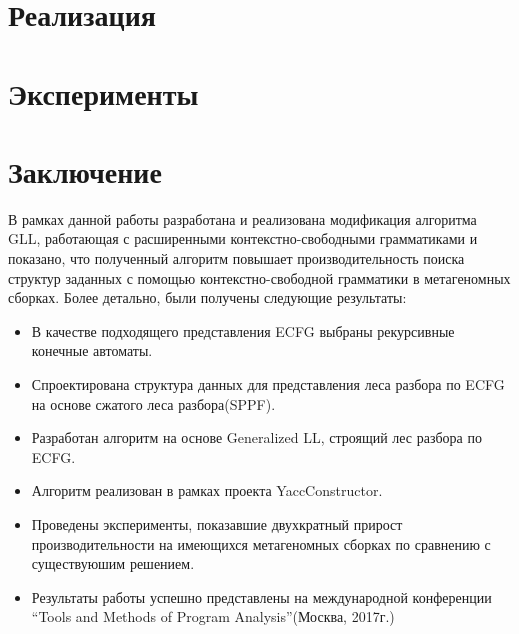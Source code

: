 \documentclass[14pt]{matmex-diploma-custom}
\begin{document}
	
	
	
	
	
	\section{Реализация}
	\section{Эксперименты}
	
	\section*{Заключение}
	В рамках данной работы разработана и реализована модификация алгоритма GLL,
	работающая с расширенными контекстно-свободными грамматиками и показано, что полученный
	алгоритм повышает производительность поиска структур заданных с помощью контекстно-свободной
	грамматики в метагеномных сборках. Более детально, были получены следующие результаты:
	\begin{itemize}
		\item В качестве подходящего представления ECFG выбраны рекурсивные конечные автоматы.
		\item Спроектирована структура данных для представления леса разбора по ECFG 
		на основе сжатого леса разбора(SPPF).
		\item Разработан алгоритм на основе Generalized LL, строящий лес разбора по ECFG.
		\item Алгоритм реализован в рамках проекта YaccConstructor.
		\item Проведены эксперименты, показавшие двухкратный прирост 
		производительности на имеющихся метагеномных сборках по сравнению 
		с существуюшим решением.
		\item Результаты работы успешно представлены на международной конференции
		``Tools and Methods of Program Analysis''(Москва, 2017г.)
	\end{itemize}
	
	\setmonofont[Mapping=tex-text]{CMU Typewriter Text}
	
	
	
\end{document}
